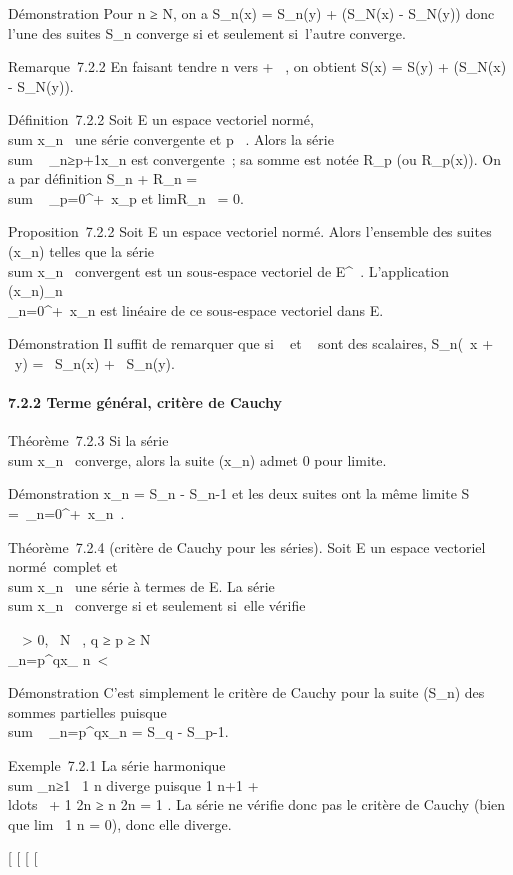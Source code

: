 \documentclass[]{article}
\begin{document}
Démonstration Pour n ≥ N, on a S_n(x) = S_n(y) +
(S_N(x) - S_N(y)) donc l'une des suites S_n
converge si et seulement si~l'autre converge.

Remarque~7.2.2 En faisant tendre n vers + \infty~, on obtient S(x) = S(y) +
(S_N(x) - S_N(y)).

Définition~7.2.2 Soit E un espace vectoriel normé,
\\sum  x_n~ une
série convergente et p \in {}~. Alors la série
\\sum ~
_n≥p+1x_n est convergente~; sa somme est notée
R_p (ou R_p(x)). On a par définition S_n +
R_n = \\sum ~
_p=0^+\infty~x_p et
limR_n~ = 0.

Proposition~7.2.2 Soit E un espace vectoriel normé. Alors l'ensemble des
suites (x_n) telles que la série
\\sum  x_n~
convergent est un sous-espace vectoriel de E^~. L'application
(x_n)_n\in{}~\mapsto~\\\sum
 _n=0^+\infty~x_n est linéaire de ce sous-espace
vectoriel dans E.

Démonstration Il suffit de remarquer que si \alpha~ et \beta~ sont des scalaires,
S_n(\alpha~x + \beta~y) = \alpha~S_n(x) + \beta~S_n(y).

\paragraph{7.2.2 Terme général, critère de Cauchy}

Théorème~7.2.3 Si la série
\\sum  x_n~
converge, alors la suite (x_n) admet 0 pour limite.

Démonstration x_n = S_n - S_n-1 et les deux
suites ont la même limite S =\
\sum  _n=0^+\infty~x_n~.

Théorème~7.2.4 (critère de Cauchy pour les séries). Soit E un espace
vectoriel normé~complet et
\\sum  x_n~ une
série à termes de E. La série
\\sum  x_n~
converge si et seulement si~elle vérifie

\forall~~\epsilon > 0,
\exists~N \in {}~, q ≥ p ≥ N
\rigtharrow~\\\sum
_n=p^qx_ n\
< \epsilon

Démonstration C'est simplement le critère de Cauchy pour la suite
(S_n) des sommes partielles puisque
\\sum ~
_n=p^qx_n = S_q - S_p-1.

Exemple~7.2.1 La série harmonique
\\sum  _n≥1~ 1
\over n diverge puisque  1 \over n+1
+ \\ldots~ + 1
n ≥ n  \over 2n = 1
\over 2 . La série ne vérifie donc pas le critère de
Cauchy (bien que lim~ 1 \over
n = 0), donc elle diverge.

[
[
[
[
\end{document}

